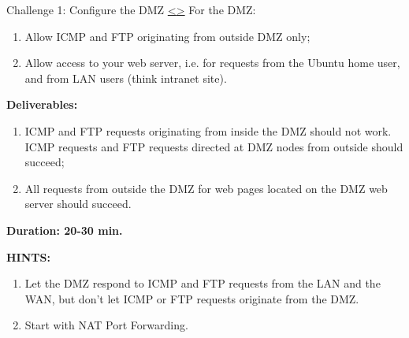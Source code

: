 \documentclass[12pt]{extarticle}
\newenvironment{instructionblock}{\Large\bgroup}{\egroup}
\newcommand{\ben}{\begin{enumerate}}
\newcommand{\een}{\end{enumerate}}
\begin{document}





\pagebreak
\begin{slide}{ Challenge 1: Configure the DMZ }{ \hyperref[slide 12]{\textless}\hyperref[slide 14]{\textgreater} }
\vskip 5pt
\begin{instructionblock}
	For the DMZ:
	\begin{enumerate}
	  \item Allow ICMP and FTP originating from outside DMZ only;
	  \item Allow access to your web server, i.e. for requests from the Ubuntu home user, and from LAN users (think intranet site).
	\end{enumerate}

	\textbf{\Large{Deliverables:}}
	\ben
		\item ICMP and FTP requests originating from inside the DMZ should not work. ICMP requests and FTP requests directed at DMZ nodes from outside should succeed;
		\item All requests from outside the DMZ for web pages located on the DMZ web server should succeed.
	\een

  \vspace{20mm}
  \begin{center}
  \textbf{\Large{Duration: 20-30 min.} }
  \end{center}

\end{instructionblock}
\end{slide}


\vspace{8mm}
\noindent
\textbf{HINTS:}
\begin{enumerate}
    \item Let the DMZ respond to ICMP and FTP requests from the LAN and the WAN, but don't let ICMP or FTP requests originate from the DMZ.
    \item Start with NAT Port Forwarding.
\end{enumerate}



\end{document}
